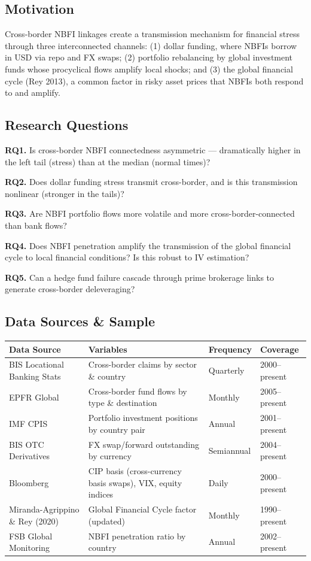 \documentclass[11pt,a4paper]{article}
\begin{document}
\subsection{Motivation}

Cross-border NBFI linkages create a transmission mechanism for financial stress
through three interconnected channels: (1) dollar funding, where NBFIs borrow
in USD via repo and FX swaps; (2) portfolio rebalancing by global investment
funds whose procyclical flows amplify local shocks; and (3) the global financial
cycle (Rey 2013), a common factor in risky asset prices that NBFIs both respond
to and amplify.


\subsection{Research Questions}

\textbf{RQ1.} Is cross-border NBFI connectedness asymmetric --- dramatically higher in
the left tail (stress) than at the median (normal times)?

\textbf{RQ2.} Does dollar funding stress transmit cross-border, and is this
transmission nonlinear (stronger in the tails)?

\textbf{RQ3.} Are NBFI portfolio flows more volatile and more cross-border-connected
than bank flows?

\textbf{RQ4.} Does NBFI penetration amplify the transmission of the global financial
cycle to local financial conditions? Is this robust to IV estimation?

\textbf{RQ5.} Can a hedge fund failure cascade through prime brokerage links to
generate cross-border deleveraging?


\subsection{Data Sources \& Sample}


{\small
\begin{longtable}{|p{}|p{}|p{}|p{}|}
\hline
\textbf{Data Source} & \textbf{Variables} & \textbf{Frequency} & \textbf{Coverage} \\
\hline
\endhead
BIS Locational Banking Stats & Cross-border claims by sector \& country & Quarterly & 2000--present \\
\hline
EPFR Global & Cross-border fund flows by type \& destination & Monthly & 2005--present \\
\hline
IMF CPIS & Portfolio investment positions by country pair & Annual & 2001--present \\
\hline
BIS OTC Derivatives & FX swap/forward outstanding by currency & Semiannual & 2004--present \\
\hline
Bloomberg & CIP basis (cross-currency basis swaps), VIX, equity indices & Daily & 2000--present \\
\hline
Miranda-Agrippino \& Rey (2020) & Global Financial Cycle factor (updated) & Monthly & 1990--present \\
\hline
FSB Global Monitoring & NBFI penetration ratio by country & Annual & 2002--present \\
\hline
\end{longtable}
}
\end{document}
